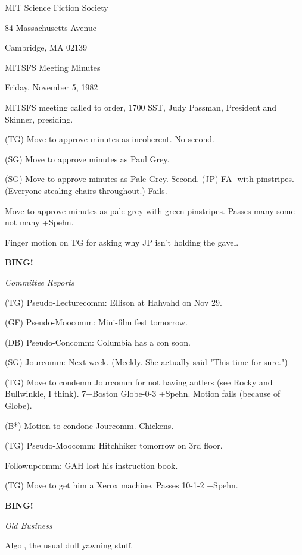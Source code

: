 \documentclass[12pt]{article}
\newcommand{\bing}{{\bf BING!} }
\newcommand{\goto}[1]{\bing \vskip 12pt \centerline{{\em{#1}}}}
\begin{document}
\begin{center}

MIT Science Fiction Society 

84 Massachusetts Avenue

Cambridge, MA 02139

\vspace{12pt}

MITSFS Meeting Minutes 

Friday, November 5, 1982

\end{center}
 
\vspace{18pt}

\setlength{\parskip}{6pt}

\noindent
MITSFS meeting called to order, 1700 SST,
Judy Passman, President and Skinner, presiding.

(TG) Move to approve minutes as incoherent. No second.

(SG) Move to approve minutes as Paul Grey.

(SG) Move to approve minutes as Pale Grey. Second. (JP) FA- with pinstripes. (Everyone stealing chairs throughout.) Fails.

Move to approve minutes as pale grey with green pinstripes. Passes many-some-not many +Spehn.

Finger motion on TG for asking why JP isn't holding the gavel.

\goto{Committee Reports}

(TG) Pseudo-Lecturecomm: Ellison at Hahvahd on Nov 29.

(GF) Pseudo-Moocomm: Mini-film fest tomorrow.

(DB) Pseudo-Concomm: Columbia has a con soon.

(SG) Jourcomm: Next week. (Meekly. She actually said "This time for sure.")

(TG) Move to condemn Jourcomm for not having antlers (see Rocky and Bullwinkle, I think). 7+Boston Globe-0-3 +Spehn. Motion fails (because of Globe).

(B*) Motion to condone Jourcomm. Chickens.

(TG) Pseudo-Moocomm: Hitchhiker tomorrow on 3rd floor.

Followupcomm: GAH lost his instruction book.

(TG) Move to get him a Xerox machine. Passes 10-1-2 +Spehn.

\goto{Old Business}

Algol, the usual dull yawning stuff.
\end{document}
